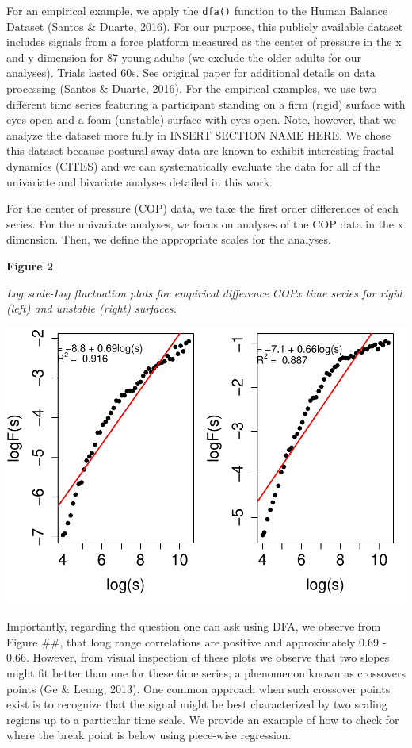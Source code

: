 \documentclass[
  man]{apa6}
\begin{document}
For an empirical example, we apply the \texttt{dfa()} function to the Human
Balance Dataset (Santos \& Duarte, 2016). For our purpose, this publicly available
dataset includes signals from a force platform measured as the center of
pressure in the x and y dimension for 87 young adults (we exclude the
older adults for our analyses). Trials lasted 60s. See original paper
for additional details on data processing (Santos \& Duarte, 2016). For the
empirical examples, we use two different time series featuring a
participant standing on a firm (rigid) surface with eyes open and a foam
(unstable) surface with eyes open. Note, however, that we analyze the
dataset more fully in INSERT SECTION NAME HERE. We chose this dataset
because postural sway data are known to exhibit interesting fractal
dynamics (CITES) and we can systematically evaluate the data for all of
the univariate and bivariate analyses detailed in this work.

For the center of pressure (COP) data, we take the first order
differences of each series. For the univariate analyses, we focus on
analyses of the COP data in the x dimension. Then, we define the
appropriate scales for the analyses.

\textbf{Figure 2}

\emph{Log scale-Log fluctuation plots for empirical difference COPx time
series for rigid (left) and unstable (right) surfaces.}

\includegraphics{fractal_regression_paper_brm_files/figure-latex/unnamed-chunk-5-1.pdf}

Importantly, regarding the question one can ask using DFA, we observe
from Figure \#\#, that long range correlations are positive and
approximately 0.69 -
0.66. However, from visual inspection of
these plots we observe that two slopes might fit better than one for
these time series; a phenomenon known as crossovers points (Ge \& Leung, 2013).
One common approach when such crossover points exist is to recognize
that the signal might be best characterized by two scaling regions up to
a particular time scale. We provide an example of how to check for where
the break point is below using piece-wise regression.
\end{document}
